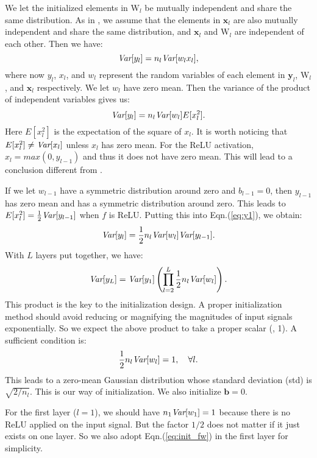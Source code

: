 \documentclass[10pt,twocolumn,letterpaper]{article}
\newcommand{\ve}[1]{\mathbf{#1}} %
\newcommand{\ma}[1]{\mathrm{#1}} %
\newcommand{\var}{\emph{Var}}
\begin{document}
We let the initialized elements in $\ma{W}_{l}$ be mutually independent and share the same distribution.
As in \cite{Glorot2010}, we assume that the elements in $\ve{x}_l$ are also mutually independent and share the same distribution, and $\ve{x}_l$ and $\ma{W}_{l}$ are independent of each other. Then we have:
\begin{equation}
\var[y_{l}]=n_l\var[w_{l}x_l],
\end{equation}
where now $y_{l}$, $x_{l}$, and $w_{l}$ represent the random variables of each element in $\ve{y}_l$, $\ma{W}_l$, and $\ve{x}_l$ respectively. We let $w_{l}$ have zero mean. Then the variance of the product of independent variables gives us:
\begin{equation}\label{eq:y1}
\var[y_{l}]=n_l\var[w_{l}]E[x^2_{l}].
\end{equation}
Here $E[x^2_{l}]$ is the expectation of the square of $x_l$. It is worth noticing that $E[x^2_{l}]\neq \var[x_l]$ unless $x_l$ has zero mean. For the ReLU activation, $x_{l}=max(0, y_{l-1})$ and thus it does not have zero mean. This will lead to a conclusion different from \cite{Glorot2010}.

If we let $w_{l-1}$ have a symmetric distribution around zero and $b_{l-1}=0$, then $y_{l-1}$ has zero mean and has a symmetric distribution around zero. This leads to
$E[x^2_{l}]=\frac{1}{2}\var[y_{l-1}]$ when $f$ is ReLU.
Putting this into Eqn.(\ref{eq:y1}), we obtain:
\begin{equation}\label{eq:y2}
\var[y_{l}]=\frac{1}{2}n_l\var[w_{l}]\var[y_{l-1}].
\end{equation}
With $L$ layers put together, we have:
\begin{equation}\label{eq:prod_fw}
\var[y_{L}]=\var[y_{1}]\left(\prod_{l=2}^{L}\frac{1}{2}n_l\var[w_{l}]\right).
\end{equation}
This product is the key to the initialization design. A proper initialization method should avoid reducing or magnifying the magnitudes of input signals exponentially. So we expect the above product to take a proper scalar (\eg, 1). A sufficient condition is:
\begin{equation}\label{eq:init_fw}
\frac{1}{2}n_l\var[w_{l}]=1, \quad \forall l.
\end{equation}
This leads to a zero-mean Gaussian distribution whose standard deviation (std) is $\sqrt{2/{n_l}}$. This is our way of initialization. We also initialize $\ve{b}=0$.

For the first layer ($l=1$), we should have $n_1\var[w_{1}]=1$ because there is no ReLU applied on the input signal.
But the factor $1/2$ does not matter if it just exists on one layer. So we also adopt Eqn.(\ref{eq:init_fw}) in the first layer for simplicity.
\end{document}
